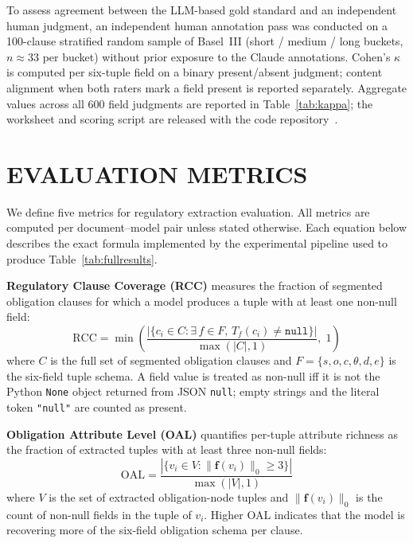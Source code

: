 \documentclass{article}
\begin{document}
To assess agreement between the LLM-based gold standard and an
independent human judgment, an independent human annotation pass
was conducted on a 100-clause stratified random sample of Basel~III
(short / medium / long buckets, $n \approx 33$ per bucket) without
prior exposure to the Claude annotations. Cohen's $\kappa$ is
computed per six-tuple field on a binary present/absent judgment;
content alignment when both raters mark a field present is reported
separately. Aggregate values across all 600 field judgments are
reported in Table~\ref{tab:kappa}; the worksheet and scoring script
are released with the code repository~\cite{rigcode2025}.

\section{EVALUATION METRICS}
\label{sec:metrics}

We define five metrics for regulatory extraction evaluation.
All metrics are computed per document--model pair unless stated otherwise.
Each equation below describes the exact formula implemented by the
experimental pipeline used to produce Table~\ref{tab:fullresults}.

\textbf{Regulatory Clause Coverage (RCC)}
measures the fraction of segmented obligation clauses for which a
model produces a tuple with at least one non-null field:
\begin{equation}
\text{RCC} = \min\!\left(\frac{|\{c_i \in C :
  \exists\, f \in F,\, T_f(c_i) \neq \texttt{null}\}|}{\max(|C|, 1)},\; 1\right)
\label{eq:rcc}
\end{equation}
where $C$ is the full set of segmented obligation clauses and
$F = \{s, o, c, \theta, d, e\}$ is the six-field tuple schema.
A field value is treated as non-null iff it is not the Python
\texttt{None} object returned from JSON \texttt{null}; empty strings
and the literal token \texttt{"null"} are counted as present.

\textbf{Obligation Attribute Level (OAL)}
quantifies per-tuple attribute richness as the fraction of extracted
tuples with at least three non-null fields:
\begin{equation}
\text{OAL} = \frac{|\{v_i \in V : \|\mathbf{f}(v_i)\|_0 \geq 3\}|}{\max(|V|, 1)}
\label{eq:oal}
\end{equation}
where $V$ is the set of extracted obligation-node tuples and
$\|\mathbf{f}(v_i)\|_0$ is the count of non-null fields in the tuple
of $v_i$.
Higher OAL indicates that the model is recovering more of the
six-field obligation schema per clause.
\end{document}

